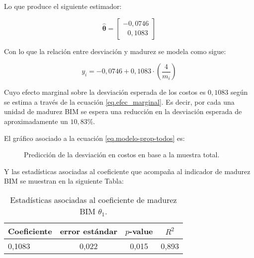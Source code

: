 Lo que produce el siguiente estimador:

\begin{equation}
    \hat{\bm{\theta}} = 
        \begin{bmatrix}
            -0,0746 \\
            ~~~0,1083
        \end{bmatrix}
\end{equation}

Con lo que la relación entre desviación y madurez se modela como sigue:

\begin{equation}
    \label{eq.modelo-prop-todos}
    y_i = -0,0746 + 0,1083\cdot \left( \frac{4}{m_i} \right)
\end{equation}

Cuyo efecto marginal sobre la desviación esperada de los costos es $0,1083$ según se estima a través de la ecuación \eqref{eq.efec_marginal}. Es decir, por cada una unidad de madurez BIM se espera una reducción en la desviación esperada de aproximadamente un $10,83\%$.

El gráfico asociado a la ecuación \eqref{eq.modelo-prop-todos} es:

\begin{figure}[H]
    \centering
    \caption{Predicción de la desviación en costos en base a la muestra total.}
\end{figure}

Y las estadísticas asociadas al coeficiente que acompaña al indicador de madurez BIM se muestran en la siguiente Tabla:

\begin{table}[H]
    \centering
    \label{tab.est}
    \caption{Estadísticas asociadas al coeficiente de madurez BIM $\theta_1$.}
    \begin{tabular}{lccc}
        \toprule
        Coeficiente & error estándar & $p$-value & $R^2$\\
        \midrule
        0,1083      & 0,022          & 0,015     & 0,893\\  
        \bottomrule        
    \end{tabular}
\end{table}

